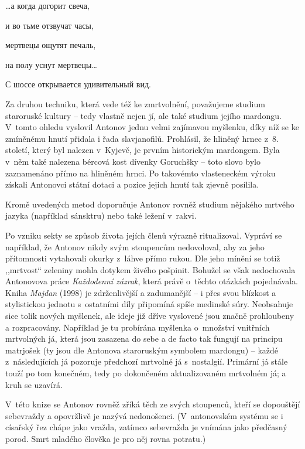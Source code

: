 \begin{pairs}
\begin{Leftside}
{\pstart
\ldots а когда догорит свеча,

и во тьме отзвучат часы,

мертвецы ощутят печаль,

на полу уснут мертвецы\ldots
\pend

\pstart
С шоссе открывается удивительный вид.
\pend}
\endnumbering
\end{Leftside}

\begin{Rightside}
\beginnumbering
{}
\pstart
Za druhou techniku, která vede též ke zmrtvolnění, považujeme studium staroruské kultury -- tedy vlastně nejen jí, ale také studium jejího mardongu. V~tomto ohledu vyslovil Antonov jednu velmi zajímavou myšlenku, díky níž se ke zmíněnému hnutí přidala i řada slavjanofilů. Prohlásil, že hliněný hrnec z~8. století, který byl nalezen v~Kyjevě, je prvním historickým mardongem. Byla v~něm také nalezena bércová kost dívenky Goruchšky -- toto slovo bylo zaznamenáno přímo na hliněném hrnci. Po takovémto vlasteneckém výroku získali Antonovci státní dotaci a pozice jejich hnutí tak zjevně posílila.
\pend

\pstart
Kromě uvedených metod doporučuje Antonov rovněž studium nějakého mrtvého jazyka (například sánsktru) nebo také ležení v~rakvi.
\pend

\pstart
Po vzniku sekty se způsob života jejích členů výrazně ritualizoval.  Vypráví se například, že Antonov nikdy svým stoupencům nedovoloval, aby za jeho přítomnosti vytahovali okurky z~láhve přímo rukou. Dle jeho mínění se totiž ,,mrtvost`` zeleniny mohla dotykem živého pošpinit. Bohužel se však nedochovala Antonovova práce \textit{Každodenní zázrak}, která právě o~těchto otázkách pojednávala. Kniha \textit{Majdan} (1998) je zdrženlivější a zadumanější -- i přes svou blízkost a stylistickou jednotu s~ostatními díly připomíná spíše medinské súry. Neobsahuje sice tolik nových myšlenek, ale ideje již dříve vyslovené jsou značně prohloubeny a rozpracovány. Například je tu probírána myšlenka o~množství vnitřních mrtvolných já, která jsou zasazena do sebe a  de facto tak fungují na principu matrjošek (ty jsou dle Antonova staroruským symbolem mardongu) -- každé z~následujících já pozoruje předchozí mrtvolné já s~nostalgií. Primární já stále touží po tom konečném, tedy po dokončeném aktualizovaném mrtvolném já; a kruh se uzavírá.
\pend

\pstart
V~této knize se Antonov rovněž zříká těch ze svých stoupenců, kteří se dopouštějí sebevraždy a opovržlivě je nazývá nedonošenci. (V~antonovském systému se i císařský řez chápe jako vražda, zatímco sebevražda je vnímána jako předčasný porod. Smrt mladého člověka je pro něj rovna potratu.)
\pend


\end{Rightside}
\end{pairs}
